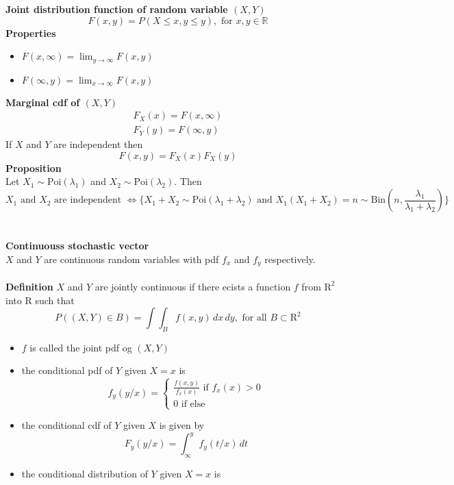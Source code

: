 \documentclass[12pt,a4paper,draft]{report}
\author{Frederik Appel Vardinghus-Nielsen}
\begin{document}
\noindent \textbf{Joint distribution function of random variable $(X,Y)$}
\begin{equation}
F(x,y)=P(X\leq x,y\leq y),\text{ for }x,y\in\mathbb{R}
\end{equation}
\textbf{Properties}
\begin{itemize}
\item $F(x,\infty)=\lim_{y\to\infty}F(x,y)$
\item $F(\infty,y)=\lim_{x\to\infty}F(x,y)$
\end{itemize}
\textbf{Marginal cdf of $(X,Y)$}
\begin{align*}
F_X(x)=F(x,\infty)\\
F_Y(y)=F(\infty,y)
\end{align*}
If $X$ and $Y$ are independent then
\begin{equation}
F(x,y)=F_X(x)F_X(y)
\end{equation}
\textbf{Proposition}\\
Let $X_1\sim \text{Poi}(\lambda_1)$ and $X_2\sim\text{Poi}(\lambda_2)$. Then
\begin{equation}
X_1\text{ and }X_2\text{ are independent } \Leftrightarrow\{X_1+X_2\sim\text{Poi}(\lambda_1+\lambda_2)\text{ and }X_1(X_1+X_2)=n\sim\text{Bin}(n,\frac{\lambda_1}{\lambda_1+\lambda_2})\}
\end{equation}
\\\\
\textbf{Continuouss stochastic vector}\\
$X$ and $Y$ are continuous random variables with pdf $f_x$ and $f_y$ respectively.\\\\
\textbf{Definition} $X$ and $Y$ are jointly continuous if there ecists a function $f$ from $\mathrm{R}^2$ into $\mathrm{R}$ such that
\begin{equation}
P((X,Y)\in B)=\int\! \int_B\!f(x,y)\,dx\,dy,\text{ for all }B\subset\mathrm{R}^2
\end{equation}
\begin{itemize}
\item $f$ is called the joint pdf og $(X,Y)$
\item the conditional pdf of $Y$ given $X=x$ is 
\begin{equation}
f_y(y/x)=\begin{cases}\frac{f(x,y)}{f_x(x)}\text{ if }f_x(x)>0\\
0 \text{ if else}\end{cases}
\end{equation}
\item the conditional cdf of $Y$ given $X$ is given by 
\begin{equation}
F_y(y/x)=\int_{\infty}^y\!f_y(t/x)\,dt
\end{equation}
\item the conditional distribution of $Y$ given $X=x$ is
\end{itemize}
\end{document}
